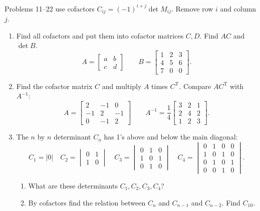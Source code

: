 \documentclass[14pt, a4paper]{article}
\begin{document}
\noindent Problems 11--22 use cofactors $C_{ij} = (-1)^{i+j} \det M_{ij}$. Remove row $i$ and column $j$.


\begin{enumerate}[resume]
    \item Find all cofactors and put them into cofactor matrices $C, D$. Find $AC$ and $\det B$.
          \[
              A = \begin{bmatrix} a & b \\ c & d \end{bmatrix} \qquad
              B = \begin{bmatrix} 1 & 2 & 3 \\ 4 & 5 & 6 \\ 7 & 0 & 0 \end{bmatrix} .
          \]


    \item Find the cofactor matrix $C$ and multiply $A$ times $C^{\text{T}}$. Compare $AC^{\text{T}}$ with $A^{-1}$:
          \[
              A = \begin{bmatrix} 2 & -1 & 0 \\ -1 & 2 & -1 \\ 0 & -1 & 2 \end{bmatrix} \qquad
              A^{-1} = \frac{1}{4} \begin{bmatrix} 3 & 2 & 1 \\ 2 & 4 & 2 \\ 1 & 2 & 3 \end{bmatrix} .
          \]

    \item The $n$ by $n$ determinant $C_n$ has 1's above and below the main diagonal:
          \[
              C_1 = |0| \quad
              C_2 = \begin{vmatrix} 0 & 1 \\ 1 & 0 \end{vmatrix} \quad
              C_3 = \begin{vmatrix} 0 & 1 & 0 \\ 1 & 0 & 1 \\ 0 & 1 & 0 \end{vmatrix} \quad
              C_4 = \begin{vmatrix} 0 & 1 & 0 & 0 \\ 1 & 0 & 1 & 0 \\ 0 & 1 & 0 & 1 \\ 0 & 0 & 1 & 0 \end{vmatrix} .
          \]
          \begin{enumerate}
              \item What are these determinants $C_1, C_2, C_3, C_4$?
              \item By cofactors find the relation between $C_n$ and $C_{n-1}$ and $C_{n-2}$. Find $C_{10}$.
          \end{enumerate}


\end{enumerate}
\end{document}
